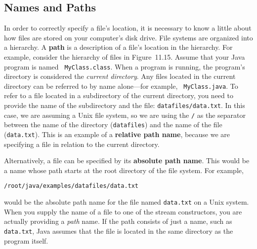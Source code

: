 \subsection{Names and Paths}
\noindent In order to correctly specify a file's location, it is
necessary to know a little about how files are stored on your
computer's disk drive.  File systems are organized into a hierarchy.
A {\bf path} is a description of a file's location in the
hierarchy.  For example, consider the hierarchy of files in
Figure~11.15.  Assume that your Java program is named {\tt
MyClass.class}. When a program is running, the program's directory is
considered the {\it current directory}. Any files located in the
current directory can be referred to by name alone---for example, {\tt
MyClass.java}. To refer to a file located in a subdirectory of the
current directory, you need to provide the name of the subdirectory
and the file: {\tt datafiles/data.txt}.  In this case, we are assuming
a Unix file system, so we are using the \verb|/| as the separator
between the name of the directory ({\tt datafiles}) and the name of
the file ({\tt data.txt}).  This is an example of a {\bf relative path
name}, because we are specifying a file in relation to the current
directory.

Alternatively, a file can be specified by its {\bf absolute path
name}. This would be a name whose path
starts at the root directory of the file system.  For example,

\begin{jjjlisting}
\begin{lstlisting}
/root/java/examples/datafiles/data.txt 
\end{lstlisting}
\end{jjjlisting}

\noindent would be the
absolute path name for the file named {\tt data.txt} on a Unix system.
When you supply the name of a file to one of the stream constructors,
you are actually providing a {\it path} name.  If the path consists of
just a name, such as {\tt data.txt}, Java assumes that the file is
located in the same directory as the program itself.




